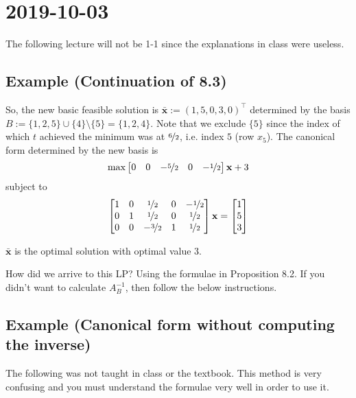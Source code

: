 \section{2019-10-03}
\begin{remark}
    The following lecture will not be 1-1 since the explanations in class were useless.
\end{remark}

\subsection{Example (Continuation of 8.3)}
So, the new basic feasible solution is $\mathbf{\bar{x}}:=(1,5,0,3,0)^\top$
determined by the basis $B:=\{1,2,5\}\cup\{4\}\setminus \{5\}=\{1,2,4\}$. Note that
we exclude $\{5\}$ since the index of which $t$ achieved the minimum was at
$\nicefrac{6}{2}$, i.e. index $5$ (row $x_5$). The canonical form determined by the new
basis is
\[\max \begin{bmatrix}
    0 & 0 & -\nicefrac{5}{2} & 0 & -\nicefrac{1}{2}
\end{bmatrix}\mathbf{x}+3\]
subject to
\[
    \begin{bmatrix}
        1 & 0 & \nicefrac{1}{2} & 0 & -\nicefrac{1}{2}\\
        0 & 1 & \nicefrac{1}{2} & 0 & \nicefrac{1}{2}\\
        0 & 0 & -\nicefrac{3}{2} & 1 & \nicefrac{1}{2}
    \end{bmatrix}\mathbf{x}
    =
    \begin{bmatrix}
        1\\
        5\\
        3
    \end{bmatrix}
\]
\begin{remark}
    $\mathbf{\bar{x}}$ is the optimal solution with optimal value $3$.
\end{remark}
\begin{remark}
    How did we arrive to this LP? Using the formulae in Proposition 8.2. If you didn't want to
    calculate $A_B^{-1}$, then follow the below instructions.
\end{remark}

\subsection{Example (Canonical form without computing the inverse)}
\begin{remark}
    The following was not taught in class or the textbook. 
    This method is very confusing and you must understand the formulae very 
    well in order to use it.
\end{remark}


